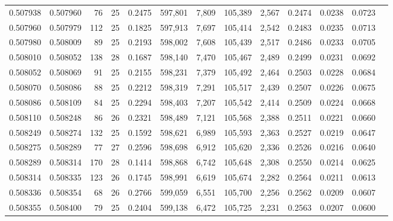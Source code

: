 \begin{tabular}{rrrrrrrrrrrrr}
0.507938 & 0.507960 &  76 &  25 &                                     0.2475 & 597,801 &   7,809 & 105,389 &   2,567 & 0.2474 & 0.0238 & 0.0723 \\
0.507960 & 0.507979 & 112 &  25 &                                     0.1825 & 597,913 &   7,697 & 105,414 &   2,542 & 0.2483 & 0.0235 & 0.0713 \\
0.507980 & 0.508009 &  89 &  25 &                                     0.2193 & 598,002 &   7,608 & 105,439 &   2,517 & 0.2486 & 0.0233 & 0.0705 \\
0.508010 & 0.508052 & 138 &  28 &                                     0.1687 & 598,140 &   7,470 & 105,467 &   2,489 & 0.2499 & 0.0231 & 0.0692 \\
0.508052 & 0.508069 &  91 &  25 &                                     0.2155 & 598,231 &   7,379 & 105,492 &   2,464 & 0.2503 & 0.0228 & 0.0684 \\
0.508070 & 0.508086 &  88 &  25 &                                     0.2212 & 598,319 &   7,291 & 105,517 &   2,439 & 0.2507 & 0.0226 & 0.0675 \\
0.508086 & 0.508109 &  84 &  25 &                                     0.2294 & 598,403 &   7,207 & 105,542 &   2,414 & 0.2509 & 0.0224 & 0.0668 \\
0.508110 & 0.508248 &  86 &  26 &                                     0.2321 & 598,489 &   7,121 & 105,568 &   2,388 & 0.2511 & 0.0221 & 0.0660 \\
0.508249 & 0.508274 & 132 &  25 &                                     0.1592 & 598,621 &   6,989 & 105,593 &   2,363 & 0.2527 & 0.0219 & 0.0647 \\
0.508275 & 0.508289 &  77 &  27 &                                     0.2596 & 598,698 &   6,912 & 105,620 &   2,336 & 0.2526 & 0.0216 & 0.0640 \\
0.508289 & 0.508314 & 170 &  28 &                                     0.1414 & 598,868 &   6,742 & 105,648 &   2,308 & 0.2550 & 0.0214 & 0.0625 \\
0.508314 & 0.508335 & 123 &  26 &                                     0.1745 & 598,991 &   6,619 & 105,674 &   2,282 & 0.2564 & 0.0211 & 0.0613 \\
0.508336 & 0.508354 &  68 &  26 &                                     0.2766 & 599,059 &   6,551 & 105,700 &   2,256 & 0.2562 & 0.0209 & 0.0607 \\
0.508355 & 0.508400 &  79 &  25 &                                     0.2404 & 599,138 &   6,472 & 105,725 &   2,231 & 0.2563 & 0.0207 & 0.0600 \\

\end{tabular}

